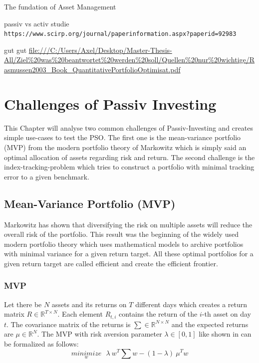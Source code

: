 \documentclass[
  oneside]{book}
\begin{document}
The fundation of Asset Management

passiv vs activ studie
\texttt{https://www.scirp.org/journal/paperinformation.aspx?paperid=92983}

gut gut
\url{file:///C:/Users/Axel/Desktop/Master-Thesis-All/Ziel\%20was\%20beantwortet\%20werden\%20soll/Quellen\%20nur\%20wichtige/Rasmussen2003_Book_QuantitativePortfolioOptimisat.pdf}

\hypertarget{challenges}{%
\chapter{Challenges of Passiv Investing}\label{challenges}}

This Chapter will analyse two common challenges of Passiv-Investing and creates simple use-cases to test the PSO. The first one is the mean-variance portfolio (MVP) from the modern portfolio theory of Markowitz which is simply said an optimal allocation of assets regarding risk and return. The second challenge is the index-tracking-problem which tries to construct a portfolio with minimal tracking error to a given benchmark.

\hypertarget{mean-variance-portfolio-mvp}{%
\section{Mean-Variance Portfolio (MVP)}\label{mean-variance-portfolio-mvp}}

Markowitz has shown that diversifying the risk on multiple assets will reduce the overall risk of the portfolio. This result was the beginning of the widely used modern portfolio theory which uses mathematical models to archive portfolios with minimal variance for a given return target. All these optimal portfolios for a given return target are called efficient and create the efficient frontier.

\hypertarget{mvp}{%
\subsection{MVP}\label{mvp}}

Let there be \(N\) assets and its returns on \(T\) different days which creates a return matrix \(R \in \mathbb{R}^{T \times N}\). Each element \(R_{t,i}\) contains the return of the \(i\)-th asset on day \(t\). The covariance matrix of the returns is \(\textstyle\sum \in \mathbb{R}^{N \times N}\) and the expected returns are \(\mu \in \mathbb{R}^{N}\). The MVP with risk aversion parameter \(\lambda \in [0,1]\) like shown in \citep{Mari2005} can be formalized as follows:
\begin{equation} 
\underset{w}{minimize} \ \ \ \lambda \ w^T \textstyle\sum w - (1-\lambda) \ \mu^T w
\label{eq:MVP}
\end{equation}
\end{document}
